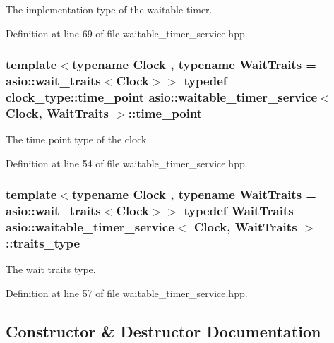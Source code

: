 The implementation type of the waitable timer. 



Definition at line 69 of file waitable\+\_\+timer\+\_\+service.\+hpp.

\hypertarget{classasio_1_1waitable__timer__service_ae2aa2b85484d98323747703cb9e104df}{}
\subsubsection[{time\+\_\+point}]{\setlength{\rightskip}{0pt plus 5cm}template$<$typename Clock , typename Wait\+Traits  = asio\+::wait\+\_\+traits$<$\+Clock$>$$>$ typedef clock\+\_\+type\+::time\+\_\+point {\bf asio\+::waitable\+\_\+timer\+\_\+service}$<$ Clock, Wait\+Traits $>$\+::{\bf time\+\_\+point}}\label{classasio_1_1waitable__timer__service_ae2aa2b85484d98323747703cb9e104df}


The time point type of the clock. 



Definition at line 54 of file waitable\+\_\+timer\+\_\+service.\+hpp.

\hypertarget{classasio_1_1waitable__timer__service_a38e8edeb0413eba7779f2bb97e87aa43}{}
\subsubsection[{traits\+\_\+type}]{\setlength{\rightskip}{0pt plus 5cm}template$<$typename Clock , typename Wait\+Traits  = asio\+::wait\+\_\+traits$<$\+Clock$>$$>$ typedef Wait\+Traits {\bf asio\+::waitable\+\_\+timer\+\_\+service}$<$ Clock, Wait\+Traits $>$\+::{\bf traits\+\_\+type}}\label{classasio_1_1waitable__timer__service_a38e8edeb0413eba7779f2bb97e87aa43}


The wait traits type. 



Definition at line 57 of file waitable\+\_\+timer\+\_\+service.\+hpp.



\subsection{Constructor \& Destructor Documentation}
\hypertarget{classasio_1_1waitable__timer__service_a9ca255ce40df3dab3047eaff2df3b487}{}
